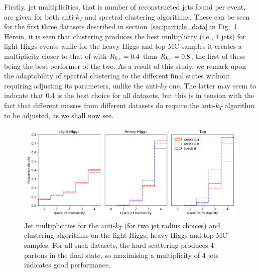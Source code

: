 Firstly, jet multiplicities, that is number of reconstructed jets found per event, are given for both anti-$k_T$ and spectral clustering algorithms.
These can be seen for the first three datasets described in section~\ref{sec:particle_data} in Fig.~\ref{fig:multiplicity}. Herein, it
 is seen that \spectral{} clustering produces the best multiplicity (i.e., 4 jets) for light Higgs events while for 
         the heavy Higgs and top MC samples  
        it creates a multiplicity closer to that of \antikt{} with \(R_{k_T}{} = 0.4\) 
        than \(R_{k_T}{} = 0.8\), the first of these being the best performer of the two. As a result of this study, we remark upon the adaptability of spectral clustering to the different final states without requiring adjusting its parameters, unlike the anti-$k_T$ one. The latter may seem to indicate that 0.4 is the best choice for all datasets, but this is in tension with the fact that different masses from different datasets do require the  anti-$k_T$ algorithm to be adjusted, as we shall now see. 



\begin{figure}[htp]
    \begin{center}
        \includegraphics[width=1.0\textwidth]{graphics/multiplicity/multiplicity}
    \end{center}
    \caption{Jet multiplicities for the anti-$k_T$ (for two jet radius choices) and \spectral{} clustering algorithms on the light Higgs, heavy Higgs and top MC 
 samples. For all such datasets, the hard scattering produces  4 partons in the final  state, so maximising a multiplicity of 4 jets indicates good performance.   
    }\label{fig:multiplicity}
\end{figure}    




